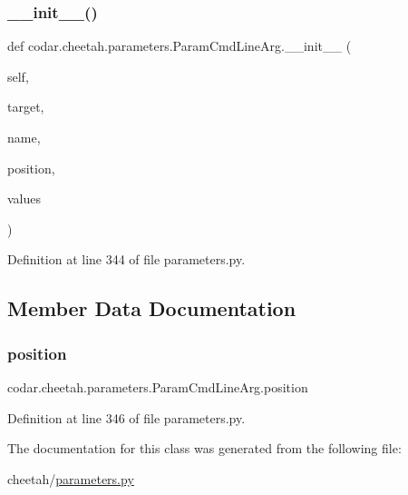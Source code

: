 \subsubsection{\texorpdfstring{\+\_\+\+\_\+init\+\_\+\+\_\+()}{\_\_init\_\_()}}
{\footnotesize\ttfamily def codar.\+cheetah.\+parameters.\+Param\+Cmd\+Line\+Arg.\+\_\+\+\_\+init\+\_\+\+\_\+ (\begin{DoxyParamCaption}\item[{}]{self,  }\item[{}]{target,  }\item[{}]{name,  }\item[{}]{position,  }\item[{}]{values }\end{DoxyParamCaption})}



Definition at line 344 of file parameters.\+py.



\subsection{Member Data Documentation}
\mbox{\label{classcodar_1_1cheetah_1_1parameters_1_1_param_cmd_line_arg_a3fc6c85c37895ee7d710475090562ab8}} 
\subsubsection{\texorpdfstring{position}{position}}
{\footnotesize\ttfamily codar.\+cheetah.\+parameters.\+Param\+Cmd\+Line\+Arg.\+position}



Definition at line 346 of file parameters.\+py.



The documentation for this class was generated from the following file\+:\begin{DoxyCompactItemize}
\item 
cheetah/\hyperlink{parameters_8py}{parameters.\+py}\end{DoxyCompactItemize}
